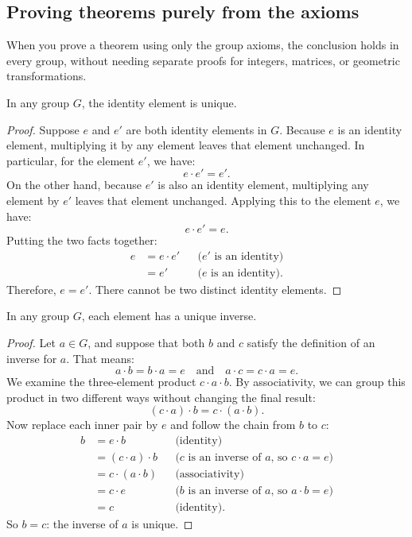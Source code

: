 \subsection{Proving theorems purely from the axioms}

When you prove a theorem using only the group axioms, the conclusion holds in every group, without needing separate proofs for integers, matrices, or geometric transformations.

\begin{theorem}\label{21:thm-identity-unique}
In any group $G$, the identity element is unique.
\end{theorem}

\begin{proof}
Suppose $e$ and $e'$ are both identity elements in $G$.
Because $e$ is an identity element, multiplying it by any element leaves that element unchanged. In particular, for the element $e'$, we have:
\[
e \cdot e' = e'.
\]
On the other hand, because $e'$ is also an identity element, multiplying any element by $e'$ leaves that element unchanged. Applying this to the element $e$, we have:
\[
e \cdot e' = e.
\]
Putting the two facts together:
\begin{align*}
e &= e \cdot e' && \text{($e'$ is an identity)} \\
  &= e'         && \text{($e$ is an identity)}.
\end{align*}
Therefore, $e = e'$. There cannot be two distinct identity elements.
\end{proof}

\begin{theorem}\label{21:thm-inverse-unique}
In any group $G$, each element has a unique inverse.
\end{theorem}

\begin{proof}
Let $a \in G$, and suppose that both $b$ and $c$ satisfy the definition of an inverse for $a$. That means:
\[
a \cdot b = b \cdot a = e \quad \text{and} \quad a \cdot c = c \cdot a = e.
\]
We examine the three-element product $c \cdot a \cdot b$. By associativity, we can group this product in two different ways without changing the final result:
\[
(c \cdot a) \cdot b = c \cdot (a \cdot b).
\]
Now replace each inner pair by $e$ and follow the chain from $b$ to $c$:
\begin{align*}
b &= e \cdot b             && \text{(identity)} \\
  &= (c \cdot a) \cdot b   && \text{($c$ is an inverse of $a$, so $c \cdot a = e$)} \\
  &= c \cdot (a \cdot b)   && \text{(associativity)} \\
  &= c \cdot e             && \text{($b$ is an inverse of $a$, so $a \cdot b = e$)} \\
  &= c                     && \text{(identity)}.
\end{align*}
So $b = c$: the inverse of $a$ is unique.
\end{proof}

